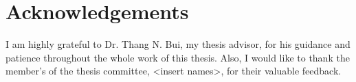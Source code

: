 \chapter*{Acknowledgements}
I am highly grateful to Dr. Thang N. Bui, my thesis advisor, for his guidance and patience throughout the whole work of this thesis. Also, I would like to thank the member's of the thesis committee, <insert names>, for their valuable feedback.